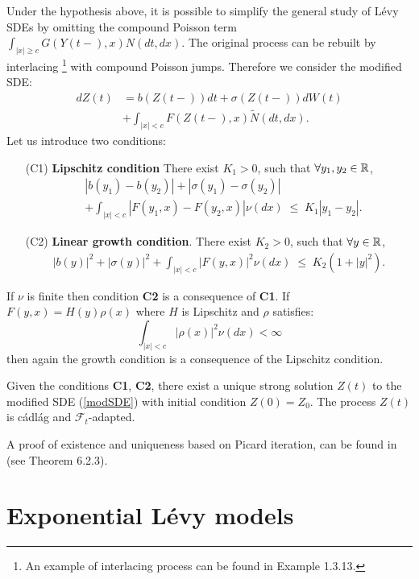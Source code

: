 Under the hypothesis above, it is possible to simplify the general study of Lévy SDEs by omitting the compound Poisson term 
$\int_{|x|\geq c} G(Y(t-),x) N(dt,dx)$. The original process can be rebuilt by interlacing \footnote{An example of interlacing
process can be found in \cite{Applebaum} Example 1.3.13.} with compound Poisson jumps.   
Therefore we consider the modified SDE:
\begin{align} \label{modSDE}
 dZ(t) &= b(Z(t-)) dt  + \sigma(Z(t-)) dW(t)\\ \nonumber
     &+ \int_{|x|<c} F(Z(t-),x) \tilde N (dt,dx).
\end{align}
Let us introduce two conditions:
\begin{itemize}
 \item[(C1)] \textbf{Lipschitz condition} There exist $K_1 >0$, such that $\forall y_1,y_2 \in \mathbb{R}$,
 \begin{align}\label{Lipschitz}
  &|b(y_1) - b(y_2)| + | \sigma(y_1) - \sigma(y_2) |  \\ 
  & + \int_{|x|<c} |F(y_1,x)-F(y_2,x)| \nu(dx) \; \leq  \; K_1 |y_1-y_2|. \nonumber %
 \end{align}
 \item[(C2)] \textbf{Linear growth condition}. There exist $K_2>0$, such that $\forall y \in \mathbb{R}$,
 \begin{align}\label{Growth}
  |b(y)|^2 + |\sigma(y)|^2 
   + \int_{|x|<c} |F(y,x)|^2 \nu(dx) \; \leq \; K_2 (1+|y|^2).    %
 \end{align}
\end{itemize}
If $\nu$ is finite then condition \textbf{C2} is a consequence of \textbf{C1}. If $F(y,x) = H(y)\rho(x)$ where $H$ is Lipschitz and 
$\rho$ satisfies:
\begin{equation}\label{rho}
 \int_{|x|<c} |\rho(x)|^2 \nu(dx) < \infty
\end{equation}
then again the growth condition is a consequence of the Lipschitz condition.
\begin{Theorem}
 Given the conditions \textbf{C1}, \textbf{C2}, there exist a unique strong solution $Z(t)$ to the modified SDE (\ref{modSDE}) with initial condition $Z(0)=Z_{0}$.
 The process $Z(t)$ is cádlág and $\mathcal{F}_t$-adapted.
\end{Theorem}
A proof of existence and uniqueness based on Picard iteration, can be found in \cite{Applebaum} (see Theorem 6.2.3). 



\section{Exponential Lévy models}

